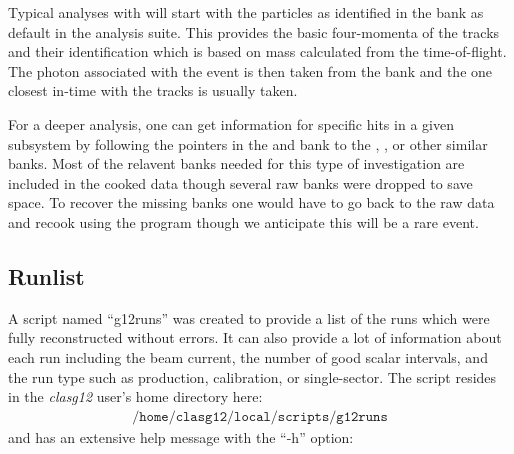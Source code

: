 Typical analyses with  will start with the particles as identified in the  bank as default in the  analysis suite. This provides the basic four-momenta of the tracks and their identification which is based on mass calculated from the time-of-flight. The photon associated with the event is then taken from the  bank and the one closest in-time with the tracks is usually taken.

For a deeper analysis, one can get information for specific hits in a given subsystem by following the pointers in the  and  bank to the , ,  or other similar banks. Most of the relavent banks needed for this type of investigation are included in the cooked data though several raw banks were dropped to save space. To recover the missing banks one would have to go back to the raw data and recook using the  program though we anticipate this will be a rare event.

\subsection{ Runlist}

A script named ``g12runs'' was created to provide a list of the runs which were fully reconstructed without errors. It can also provide a lot of information about each run including the beam current, the number of good scalar intervals, and the run type such as production, calibration, or single-sector. The script resides in the \emph{clasg12} user's home directory here:
\begin{align}
    \texttt{/home/clasg12/local/scripts/g12runs} \nonumber
\end{align}
and has an extensive help message with the ``-h'' option:

